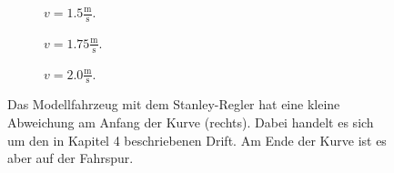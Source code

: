 \documentclass[arbeit=studie,oneside,BCOR=12mm]{ArbeitRST}
\begin{document}
\begin{figure}[h]
    \centering
    \begin{subfigure}{0.4\textwidth}
        \centering
        \caption{$v = 1.5 \frac{\mathrm{m}}{\mathrm{s}}$.}
        \label{ab:1.5}
    \end{subfigure}
    \begin{subfigure}{0.4\textwidth}
        \centering
        \caption{$v = 1.75 \frac{\mathrm{m}}{\mathrm{s}}$.}
        \label{ab:1.75}
    \end{subfigure}
    \begin{subfigure}{0.4\textwidth}
        \centering
        \caption{$v = 2.0 \frac{\mathrm{m}}{\mathrm{s}}$.}
        \label{ab:2.0}
    \end{subfigure}
    \caption{Das Modellfahrzeug mit dem Stanley-Regler hat eine kleine Abweichung am Anfang der Kurve (rechts). Dabei handelt
    es sich um den in Kapitel 4 beschriebenen Drift. Am Ende der Kurve ist es aber auf der Fahrspur.}
\end{figure}
\end{document}
